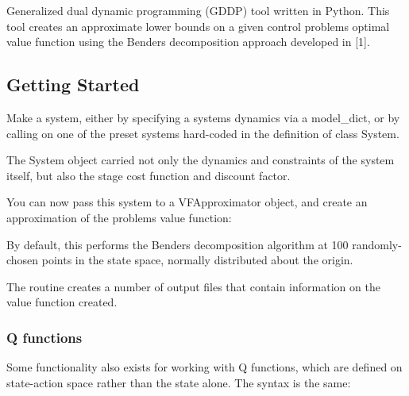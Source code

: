 Generalized dual dynamic programming (G\+D\+DP) tool written in Python. This tool creates an approximate lower bounds on a given control problem\textquotesingle{}s optimal value function using the Benders decomposition approach developed in \mbox{[}1\mbox{]}.

\subsection*{Getting Started}

Make a system, either by specifying a system\textquotesingle{}s dynamics via a {\ttfamily model\+\_\+dict}, or by calling on one of the preset systems hard-\/coded in the definition of class {\ttfamily System}.


\begin{DoxyCode}{0}
\end{DoxyCode}


The {\ttfamily System} object carried not only the dynamics and constraints of the system itself, but also the stage cost function and discount factor.

You can now pass this system to a {\ttfamily V\+F\+Approximator} object, and create an approximation of the problem\textquotesingle{}s value function\+:


\begin{DoxyCode}{0}
\end{DoxyCode}


By default, this performs the Benders decomposition algorithm at 100 randomly-\/chosen points in the state space, normally distributed about the origin.

The routine creates a number of output files that contain information on the value function created.

\subsubsection*{Q functions}

Some functionality also exists for working with Q functions, which are defined on state-\/action space rather than the state alone. The syntax is the same\+:


\begin{DoxyCode}{0}
\end{DoxyCode}


